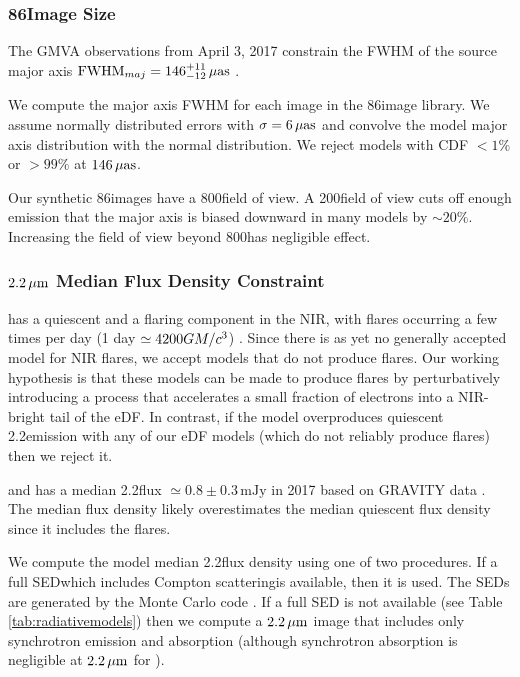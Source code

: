 \subsubsection{86\GHz Image Size}

The GMVA observations from April 3, 2017 constrain the FWHM of the source major axis ${\rm FWHM}_{maj} = 146^{+11}_{-12}\,\mathrm{\mu as}$ \citep[95\% confidence][]{2021ApJ...915...99I}.

We compute the major axis FWHM for each image in the 86\GHz image library.  We assume normally distributed errors with $\sigma = 6\,\mathrm{\mu as}$ and convolve the model major axis distribution with the normal distribution.  We reject models with CDF $< 1\%$ or $> 99\%$ at $146\,\mathrm{\mu as}$.

Our synthetic 86\GHz images have a 800\uas field of view.  A 200\uas field of view cuts off enough emission that the major axis is biased downward in many models by $\sim 20\%$.  Increasing the field of view beyond 800\uas has negligible effect.

\subsubsection{$2.2\,\mu\mathrm{m}$ Median Flux Density Constraint}\label{subsec:nir}

\sgra has a quiescent and a flaring component in the NIR, with flares occurring a few times per day 
(1 day $\simeq 4200 GM/c^3$) \citep{2018ApJ...863...15W}.  Since there is as yet no generally accepted model for NIR flares, we accept models that do not produce flares.  Our working hypothesis is that these models can be made to produce flares by perturbatively introducing a process that accelerates a small fraction of electrons into a  NIR-bright tail of the eDF.  In contrast, if the model overproduces quiescent 2.2\um emission with any of our eDF models (which do not reliably produce flares) then we reject it.

\sgra and has a median 2.2\um flux $\simeq 0.8 \pm 0.3\,\mathrm{mJy}$ in 2017 based on GRAVITY data \citep[][see Table 1]{2020A&A...638A...2G}.  The median flux density likely overestimates the median quiescent flux density since it includes the flares.  

We compute the model median 2.2\um flux density using one of two procedures.  If a full SED\textemdash which includes Compton scattering\textemdash is available, then it is used. The SEDs are generated by the \grmonty Monte Carlo code \citep{2009ApJS..184..387D, Wong_2022}. If a full SED is not available (see Table \ref{tab:radiativemodels}) then we compute a $2.2\,\mu\mathrm{m}$ image that includes only synchrotron emission and absorption (although synchrotron absorption is negligible at $2.2\,\mu\mathrm{m}$ for \sgra).

